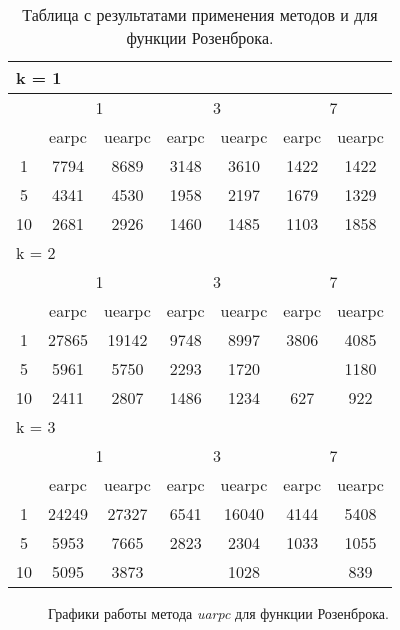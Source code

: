 \begin{table}
  \centering
  \begin{tabular}{|*7{c|}}
    \hline
    \multicolumn{7}{|l|}{k = 1} \\
    \hline
    \multirow{2}{*}{\diagbox{$\mu$}{$\lambda$}} & \multicolumn{2}{c|}{1} & \multicolumn{2}{c|}{3} & \multicolumn{2}{c|}{7} \\
    \cline{2-7}
    & earpc & uearpc & earpc & uearpc & earpc & uearpc \\
    \hline
    1 & 7794 & 8689 & 3148 & 3610 & 1422 & 1422 \\
    \hline
    5 & 4341 & 4530 & 1958 & 2197 & 1679 & 1329 \\
    \hline
    10 & 2681 & 2926 & 1460 & 1485 & 1103 & 1858 \\
    \hline
    \multicolumn{7}{|l|}{k = 2} \\
    \hline
    \multirow{2}{*}{\diagbox{$\mu$}{$\lambda$}} & \multicolumn{2}{c|}{1} & \multicolumn{2}{c|}{3} & \multicolumn{2}{c|}{7} \\
    \cline{2-7}
    & earpc & uearpc & earpc & uearpc & earpc & uearpc \\
    \hline
    1 & 27865 & 19142 & 9748 & 8997 & 3806 & 4085 \\
    \hline
    5 & 5961 & 5750 & 2293 & 1720& \cellcolor{olive}{933} & 1180 \\
    \hline
    10 & 2411 & 2807 & 1486 & 1234 & 627 & 922 \\
    \hline
    \multicolumn{7}{|l|}{k = 3} \\
    \hline
    \multirow{2}{*}{\diagbox{$\mu$}{$\lambda$}} & \multicolumn{2}{c|}{1} & \multicolumn{2}{c|}{3} & \multicolumn{2}{c|}{7} \\
    \cline{2-7}
    & earpc & uearpc & earpc & uearpc & earpc & uearpc \\
    \hline
    1 & 24249 & 27327 & 6541 & 16040 & 4144 & 5408 \\
    \hline
    5 & 5953 & 7665 & 2823& 2304 & 1033 & 1055 \\
    \hline
    10 & 5095 & 3873& \cellcolor{olive}{1013} & 1028& \cellcolor{olive}{779} & 839 \\
    \hline
  \end{tabular}
  \captionsetup{justification=centering}
  \caption{Таблица с результатами применения методов  и  для функции Розенброка.}
  \label{earpc_rosenbrock_results}
\end{table}

\begin{figure}
  \centering
  \caption{ Графики работы метода \textit{uarpc} для функции Розенброка.}
  \label{earpc_rosenbrock_plot}
\end{figure}

